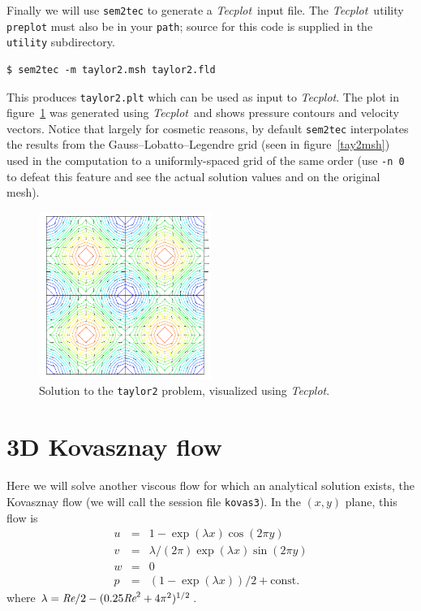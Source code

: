\documentclass[11pt]{report}
\def\Rey{\mbox{\it Re}}                             %
\newcommand{\Tecplot}{\emph{Tecplot}}
\begin{document}
Finally we will use \texttt{sem2tec} to generate a \Tecplot\ input
file.  The \Tecplot\ utility \texttt{preplot} must also be in your
\texttt{path}; source for this code is supplied in the \verb|utility|
subdirectory.  {\small
\begin{verbatim}
$ sem2tec -m taylor2.msh taylor2.fld
\end{verbatim}
}
\noindent
This produces \texttt{taylor2.plt} which can be used as input to
\Tecplot.  The plot in figure~\ref{tay2soln} was generated using
\Tecplot\ and shows pressure contours and velocity vectors.  Notice
that largely for cosmetic reasons, by default \texttt{sem2tec}
interpolates the results from the Gauss--Lobatto--Legendre grid (seen
in figure~\ref{tay2msh}) used in the computation to a uniformly-spaced
grid of the same order (use \verb|-n 0| to defeat this feature and
see the actual solution values and on the original mesh).

\begin{figure}
\begin{center}
\includegraphics[width=0.5\textwidth]{taylor2}
\end{center}
\caption{
\label{tay2soln}
  Solution to the \texttt{taylor2} problem, visualized using \Tecplot.
}
\end{figure}

\section{3D Kovasznay flow}
\label{sec.kovas}

Here we will solve another viscous flow for which an analytical
solution exists, the Kovasznay flow (we will call the session file
\verb+kovas3+).  In the $(x,y)$ plane, this flow is
\begin{eqnarray}
        u &=& 1 - \exp(\lambda x)\cos(2\pi y)           \\
        v &=& \lambda/(2\pi)\exp(\lambda x)\sin(2\pi y) \\
        w &=& 0                                         \\
        p &=& (1 - \exp(\lambda x))/2  + \textrm{const}. 
\end{eqnarray}
where $\lambda = \Rey/2 - (0.25\Rey^2 + 4\pi^2)^{1/2}$.
\end{document}
